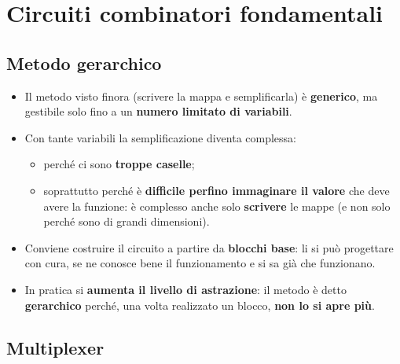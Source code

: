 \documentclass[12pt, a4paper]{article}
\begin{document}

\section{Circuiti combinatori fondamentali}

\subsection{Metodo gerarchico}
\begin{itemize}
    \item Il metodo visto finora (scrivere la mappa e semplificarla) è \textbf{generico}, ma gestibile solo fino a un \textbf{numero limitato di variabili}.
    \item Con tante variabili la semplificazione diventa complessa:
    \begin{itemize}
        \item perché ci sono \textbf{troppe caselle};
        \item soprattutto perché è \textbf{difficile perfino immaginare il valore} che deve avere la funzione: è complesso anche solo \textbf{scrivere} le mappe (e non solo perché sono di grandi dimensioni).
    \end{itemize}
    \item Conviene costruire il circuito a partire da \textcolor{blue!70!black}{\textbf{blocchi base}}: li si può progettare con cura, se ne conosce bene il funzionamento e si sa già che funzionano.
    \item In pratica si \textbf{aumenta il livello di astrazione}: il metodo è detto \textbf{gerarchico} perché, una volta realizzato un blocco, \textbf{non lo si apre più}.
\end{itemize}

\subsection{Multiplexer}
\end{document}
